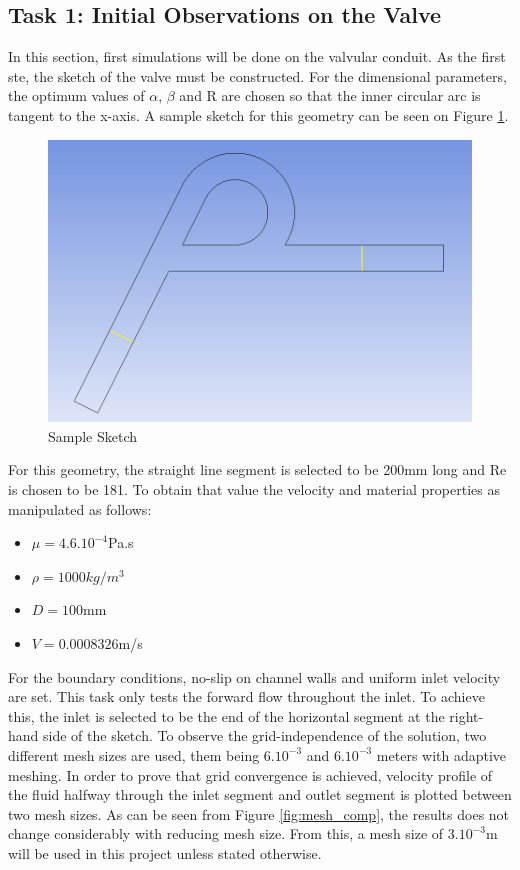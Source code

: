 \subsection{Task 1: Initial Observations on the Valve}
\label{sec:task1}

In this section, first simulations will be done on the valvular conduit. As the first ste, the sketch of the valve must be constructed. For the dimensional parameters, the optimum values of $\alpha$, $\beta$ and R are chosen so that the inner circular arc is tangent to the x-axis. A sample sketch for this geometry can be seen on Figure \ref{fig:sampsketch}.

\begin{figure}[H]
    \centering
    \includegraphics[width=.6\textwidth]{images/task1/data_locations.png}
    \caption{Sample Sketch}
    \label{fig:sampsketch}
\end{figure}

For this geometry, the straight line segment is selected to be 200mm long and Re is chosen to be 181. To obtain that value the velocity and material properties as manipulated as follows:
\begin{itemize}
    \item $\mu = 4.6.10^{-4}$Pa.s
    \item $\rho = 1000 kg/m^{3}$
    \item $D = 100$mm
    \item $V = 0.0008326$m/s
\end{itemize}

For the boundary conditions, no-slip on channel walls and uniform inlet velocity are set. This task only tests the forward flow throughout the inlet. To achieve this, the inlet is selected to be the end of the horizontal segment at the right-hand side of the sketch. To observe the grid-independence of the solution, two different mesh sizes are used, them being $6.10^{-3}$ and $6.10^{-3}$ meters with adaptive meshing. In order to prove that grid convergence is achieved, velocity profile of the fluid halfway through the inlet segment and outlet segment is plotted between two mesh sizes. As can be seen from Figure \ref{fig:mesh_comp}, the results does not change considerably with reducing mesh size. From this, a mesh size of $3.10^{-3}$m will be used in this project unless stated otherwise. 

